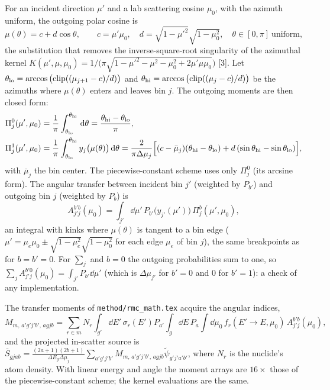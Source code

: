 \documentclass[11pt]{article}
\newcommand{\tpsi}{\tilde\psi}
\newcommand{\Sbar}{\bar S}
\begin{document}
For an incident direction $\mu'$ and a lab scattering cosine $\mu_0$, with the azimuth
uniform, the outgoing polar cosine is
\begin{equation}
  \mu(\theta) = c + d\cos\theta,\qquad c=\mu'\mu_0,\quad d=\sqrt{1-\mu'^2}\sqrt{1-\mu_0^2},
  \quad\theta\in[0,\pi]\ \text{uniform},
\end{equation}
the substitution that removes the inverse-square-root singularity of the azimuthal
kernel $K(\mu',\mu,\mu_0) = 1/\big(\pi\sqrt{1-\mu'^2-\mu^2-\mu_0^2+2\mu'\mu\mu_0}\big)$
[3]. Let $\theta_{\rm lo}=\arccos\big(\mathrm{clip}((\mu_{j+1}-c)/d)\big)$ and
$\theta_{\rm hi}=\arccos\big(\mathrm{clip}((\mu_j-c)/d)\big)$ be the azimuths where
$\mu(\theta)$ enters and leaves bin $j$. The outgoing moments are then closed form:
\begin{align}
  \Pi^{0}_j(\mu',\mu_0) &= \frac1\pi\int_{\theta_{\rm lo}}^{\theta_{\rm hi}}\,\mathrm{d}\theta
  = \frac{\theta_{\rm hi}-\theta_{\rm lo}}{\pi},\\
  \Pi^{1}_j(\mu',\mu_0) &= \frac1\pi\int_{\theta_{\rm lo}}^{\theta_{\rm hi}}
  y_j\big(\mu(\theta)\big)\,\mathrm{d}\theta
  = \frac{2}{\pi\Delta\mu_j}\Big[(c-\bar\mu_j)(\theta_{\rm hi}-\theta_{\rm lo})
  + d\,(\sin\theta_{\rm hi}-\sin\theta_{\rm lo})\Big],
\end{align}
with $\bar\mu_j$ the bin center. The piecewise-constant scheme uses only $\Pi^0_j$ (its
arcsine form). The angular transfer between incident bin $j'$ (weighted by
$P_{b'}$) and outgoing bin $j$ (weighted by $P_b$) is
\begin{equation}
  A^{b'b}_{j'j}(\mu_0) = \int_{j'}\dd\mu'\,P_{b'}\big(y_{j'}(\mu')\big)\,
  \Pi^{b}_j(\mu',\mu_0),
\end{equation}
an integral with kinks where $\mu(\theta)$ is tangent to a bin edge
($\mu' = \mu_e\mu_0\pm\sqrt{1-\mu_e^2}\sqrt{1-\mu_0^2}$ for each edge $\mu_e$ of bin
$j$), the same breakpoints as for $b=b'=0$. For $\sum_j$ and $b=0$ the outgoing
probabilities sum to one, so $\sum_jA^{b'0}_{j'j}(\mu_0)=\int_{j'}P_{b'}\dd\mu'$ (which
is $\Delta\mu_{j'}$ for $b'=0$ and $0$ for $b'=1$): a check of any implementation.

The transfer moments of \texttt{method/rmc\_math.tex} acquire the angular indices,
\begin{equation}
  M_{m,\,a'g'j'b',\,agjb} = \sum_{r\in m}N_r\int_{g'}\dd E'\,\sigma_r(E')P_{a'}
  \int_g\dd E\,P_a\int\dd\mu_0\,f_r(E'\to E,\mu_0)\,A^{b'b}_{j'j}(\mu_0),
\end{equation}
and the projected in-scatter source is
$\Sbar_{gjab}=\frac{(2a+1)(2b+1)}{\Delta E_g\Delta\mu_j}
\sum_{a'g'j'b'}M_{m,\,a'g'j'b',\,agjb}\tpsi_{g'j'a'b'}$, where $N_r$ is the
nuclide's atom density. With linear
energy and angle the moment arrays are $16\times$ those of the piecewise-constant
scheme; the kernel evaluations are the same.
\end{document}
